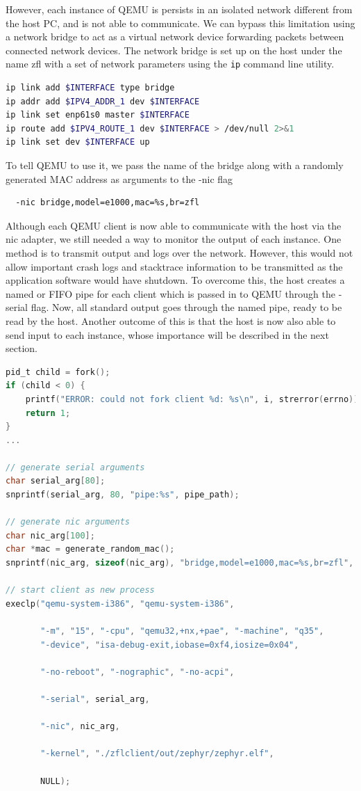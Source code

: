 \documentclass[12pt]{article}
\begin{document}
However, each instance of QEMU is persists in an isolated network different from the host PC,
and is not able to communicate. We can bypass this limitation using a network bridge to act as a
virtual network device forwarding packets between connected network devices.
The network bridge is set up on the host under the name zfl with a set of network parameters using
the \verb|ip| command line utility.
\begin{lstlisting}[language=bash,caption=Network bridge setup]
ip link add $INTERFACE type bridge
ip addr add $IPV4_ADDR_1 dev $INTERFACE
ip link set enp61s0 master $INTERFACE
ip route add $IPV4_ROUTE_1 dev $INTERFACE > /dev/null 2>&1
ip link set dev $INTERFACE up
\end{lstlisting}
To tell QEMU to use it, we pass the name of the bridge along
with a randomly generated MAC address as arguments to the -nic flag
\begin{verbatim}
  -nic bridge,model=e1000,mac=%s,br=zfl
\end{verbatim}

Although each QEMU client is now able to communicate with the host via the nic adapter, we still
needed a way to monitor the output of each instance. One method is to transmit
output and logs over the network. However, this would not allow important crash logs and stacktrace
information to be transmitted as the application software would have shutdown. To overcome this, the host
creates a named or FIFO pipe \cite{} for each client which is passed in to
QEMU through the -serial flag. Now, all standard output goes through the named pipe, ready to be read
by the host. Another outcome of this is that the host is now also able to send input to each
instance, whose importance will be described in the next section.

\begin{lstlisting}[language=C,caption=Client forking process]
pid_t child = fork();
if (child < 0) {
    printf("ERROR: could not fork client %d: %s\n", i, strerror(errno));
    return 1;
}
...

// generate serial arguments
char serial_arg[80];
snprintf(serial_arg, 80, "pipe:%s", pipe_path);

// generate nic arguments
char nic_arg[100];
char *mac = generate_random_mac();
snprintf(nic_arg, sizeof(nic_arg), "bridge,model=e1000,mac=%s,br=zfl", mac);

// start client as new process
execlp("qemu-system-i386", "qemu-system-i386",

       "-m", "15", "-cpu", "qemu32,+nx,+pae", "-machine", "q35",
       "-device", "isa-debug-exit,iobase=0xf4,iosize=0x04",

       "-no-reboot", "-nographic", "-no-acpi",

       "-serial", serial_arg,

       "-nic", nic_arg,

       "-kernel", "./zflclient/out/zephyr/zephyr.elf",

       NULL);
\end{lstlisting}
\end{document}
